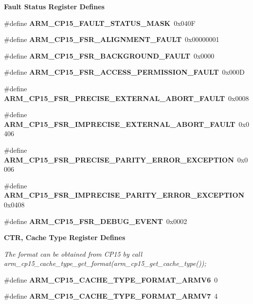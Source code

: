 \begin{Indent}\textbf{ Fault Status Register Defines}\par
\begin{DoxyCompactItemize}
\item 
\#define {\bfseries A\+R\+M\+\_\+\+C\+P15\+\_\+\+F\+A\+U\+L\+T\+\_\+\+S\+T\+A\+T\+U\+S\+\_\+\+M\+A\+SK}~0x040F
\item 
\#define {\bfseries A\+R\+M\+\_\+\+C\+P15\+\_\+\+F\+S\+R\+\_\+\+A\+L\+I\+G\+N\+M\+E\+N\+T\+\_\+\+F\+A\+U\+LT}~0x00000001
\item 
\#define {\bfseries A\+R\+M\+\_\+\+C\+P15\+\_\+\+F\+S\+R\+\_\+\+B\+A\+C\+K\+G\+R\+O\+U\+N\+D\+\_\+\+F\+A\+U\+LT}~0x0000
\item 
\#define {\bfseries A\+R\+M\+\_\+\+C\+P15\+\_\+\+F\+S\+R\+\_\+\+A\+C\+C\+E\+S\+S\+\_\+\+P\+E\+R\+M\+I\+S\+S\+I\+O\+N\+\_\+\+F\+A\+U\+LT}~0x000D
\item 
\#define {\bfseries A\+R\+M\+\_\+\+C\+P15\+\_\+\+F\+S\+R\+\_\+\+P\+R\+E\+C\+I\+S\+E\+\_\+\+E\+X\+T\+E\+R\+N\+A\+L\+\_\+\+A\+B\+O\+R\+T\+\_\+\+F\+A\+U\+LT}~0x0008
\item 
\#define {\bfseries A\+R\+M\+\_\+\+C\+P15\+\_\+\+F\+S\+R\+\_\+\+I\+M\+P\+R\+E\+C\+I\+S\+E\+\_\+\+E\+X\+T\+E\+R\+N\+A\+L\+\_\+\+A\+B\+O\+R\+T\+\_\+\+F\+A\+U\+LT}~0x0406
\item 
\#define {\bfseries A\+R\+M\+\_\+\+C\+P15\+\_\+\+F\+S\+R\+\_\+\+P\+R\+E\+C\+I\+S\+E\+\_\+\+P\+A\+R\+I\+T\+Y\+\_\+\+E\+R\+R\+O\+R\+\_\+\+E\+X\+C\+E\+P\+T\+I\+ON}~0x0006
\item 
\#define {\bfseries A\+R\+M\+\_\+\+C\+P15\+\_\+\+F\+S\+R\+\_\+\+I\+M\+P\+R\+E\+C\+I\+S\+E\+\_\+\+P\+A\+R\+I\+T\+Y\+\_\+\+E\+R\+R\+O\+R\+\_\+\+E\+X\+C\+E\+P\+T\+I\+ON}~0x0408
\item 
\#define {\bfseries A\+R\+M\+\_\+\+C\+P15\+\_\+\+F\+S\+R\+\_\+\+D\+E\+B\+U\+G\+\_\+\+E\+V\+E\+NT}~0x0002
\end{DoxyCompactItemize}
\end{Indent}
\begin{Indent}\textbf{ C\+TR, Cache Type Register Defines}\par
{\em The format can be obtained from C\+P15 by call arm\+\_\+cp15\+\_\+cache\+\_\+type\+\_\+get\+\_\+format(arm\+\_\+cp15\+\_\+get\+\_\+cache\+\_\+type()); }\begin{DoxyCompactItemize}
\item 
\#define {\bfseries A\+R\+M\+\_\+\+C\+P15\+\_\+\+C\+A\+C\+H\+E\+\_\+\+T\+Y\+P\+E\+\_\+\+F\+O\+R\+M\+A\+T\+\_\+\+A\+R\+M\+V6}~0
\item 
\#define {\bfseries A\+R\+M\+\_\+\+C\+P15\+\_\+\+C\+A\+C\+H\+E\+\_\+\+T\+Y\+P\+E\+\_\+\+F\+O\+R\+M\+A\+T\+\_\+\+A\+R\+M\+V7}~4
\end{DoxyCompactItemize}
\end{Indent}
